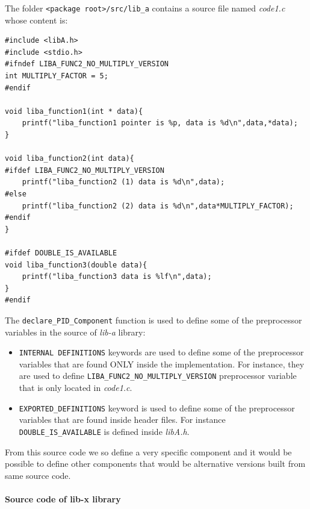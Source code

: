 \documentclass[12pt,a4paper]{article}
\begin{document}
The folder \texttt{<package root>/src/lib\_a} contains a source file named \textit{code1.c} whose content is: 
\begin{verbatim}
#include <libA.h>
#include <stdio.h>
#ifndef LIBA_FUNC2_NO_MULTIPLY_VERSION
int MULTIPLY_FACTOR = 5;
#endif

void liba_function1(int * data){
	printf("liba_function1 pointer is %p, data is %d\n",data,*data);
}

void liba_function2(int data){
#ifdef LIBA_FUNC2_NO_MULTIPLY_VERSION
	printf("liba_function2 (1) data is %d\n",data);
#else
	printf("liba_function2 (2) data is %d\n",data*MULTIPLY_FACTOR);
#endif
}

#ifdef DOUBLE_IS_AVAILABLE
void liba_function3(double data){
	printf("liba_function3 data is %lf\n",data);
}
#endif
\end{verbatim}

The \texttt{declare\_PID\_Component} function is used to define some of the preprocessor variables in the source of \textit{lib-a} library:
\begin{itemize}
\item \texttt{INTERNAL DEFINITIONS} keywords are used to define some of the preprocessor variables that are found ONLY inside the implementation. For instance, they are used to define \texttt{LIBA\_FUNC2\_NO\_MULTIPLY\_VERSION} preprocessor variable that is only located in \textit{code1.c}.
\item \texttt{EXPORTED\_DEFINITIONS} keyword is used to define some of the preprocessor variables that are found inside header files. For instance \texttt{DOUBLE\_IS\_AVAILABLE} is defined inside \textit{libA.h}.
\end{itemize}
From this source code we so define a very specific component and it would be possible to define other components that would be alternative versions built from same source code.

\paragraph{Source code of lib-x library}
\end{document}
